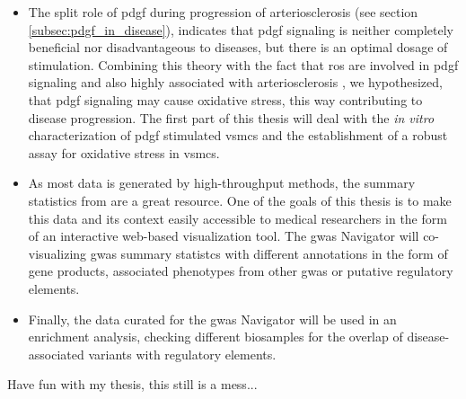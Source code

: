 \begin{itemize}
    \item The split role of \ac{pdgf} during progression of arteriosclerosis (see section \ref{subsec:pdgf_in_disease}), indicates that \ac{pdgf} signaling is neither completely beneficial nor disadvantageous to diseases, but there is an optimal dosage of stimulation. Combining this theory with the fact that \ac{ros} are involved in \ac{pdgf} signaling and also highly associated with arteriosclerosis \cite{burtenshawReactiveOxygenSpecies2019}, we hypothesized, that \ac{pdgf} signaling may cause oxidative stress, this way contributing to disease progression. The first part of this thesis will deal with the \textit{in vitro} characterization of \ac{pdgf} stimulated \acp{vsmc} and the establishment of a robust assay for oxidative stress in \acp{vsmc}.
    \item As most data is generated by high-throughput methods, the summary statistics from \textcite{aragamDiscoverySystematicCharacterization2021} are a great resource. One of the goals of this thesis is to make this data and its context easily accessible to medical researchers in the form of an interactive web-based visualization tool. The \ac{gwas} Navigator will co-visualizing \ac{gwas} summary statistcs with different annotations in the form of gene products, associated phenotypes from other \ac{gwas} or putative regulatory elements.
    \item Finally, the data curated for the \ac{gwas} Navigator will be used in an enrichment analysis, checking different biosamples for the overlap of disease-associated variants with regulatory elements.
\end{itemize}

Have fun with my thesis, this still is a mess...
